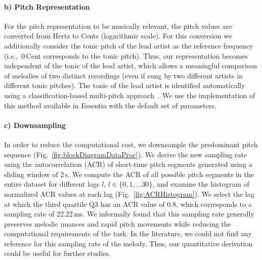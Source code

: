 \paragraph{b) Pitch Representation} For the pitch representation to be musically relevant, the pitch values are converted from Hertz to Cents (logarithmic scale). For this conversion we additionally consider the tonic pitch of the lead artist as the reference frequency (i.e.,~0\,Cent corresponds to the tonic pitch). Thus, our representation becomes independent of the tonic of the lead artist, which allows a meaningful comparison of melodies of two distinct recordings (even if sung by two different artists in different tonic pitches). The tonic of the lead artist is identified automatically using a classification-based multi-pitch approach~\cite{Gulati2014Tonic}. We use the implementation of this method available in Essentia with the default set of parameters.%



\paragraph{c) Downsampling} In order to reduce the computational cost, we downsample the predominant pitch sequence (Fig.~\ref{fig:blockDiagramDataProc}). We derive the new sampling rate using the autocorrelation (ACR) of short-time pitch segments generated using a sliding window of 2\,s. We compute the ACR of all possible pitch segments in the entire dataset for different lags $l$, $l\in \lbrace0,1,\dots30\rbrace$, and examine the histogram of normalized ACR values at each lag (Fig.~\ref{fig:ACRHistogram}). %
We select the lag at which the third quartile Q3 has an ACR value of 0.8, which corresponds to a sampling rate of 22.22\,ms. We informally found that this sampling rate generally preserves melodic nuances and rapid pitch movements while reducing the computational requirements of the task. In the literature, we could not find any reference for this sampling rate of the melody. Thus, our quantitative derivation could be useful for further studies.



